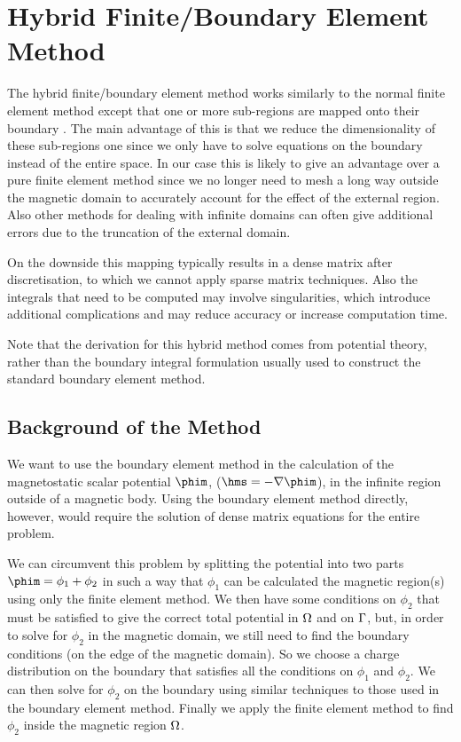 
\chapter{Hybrid Finite/Boundary Element Method}
\label{sec:hybr-finit-elem}
The hybrid finite/boundary element method works similarly to the normal finite element method except that one or more sub-regions are mapped onto their boundary \cite{Rammohan2002}.
The main advantage of this is that we reduce the dimensionality of these sub-regions one since we only have to solve equations on the boundary instead of the entire space.
In our case this is likely to give an advantage over a pure finite element method since we no longer need to mesh a long way outside the magnetic domain to accurately account for the effect of the external region. Also other methods for dealing with infinite domains can often give additional errors due to the truncation of the external domain.\cite{Bottauscio2008}

On the downside this mapping typically results in a dense matrix after discretisation, to which we cannot apply sparse matrix techniques.
Also the integrals that need to be computed may involve singularities, which introduce additional complications and may reduce accuracy or increase computation time.

Note that the derivation for this hybrid method comes from potential theory, rather than the boundary integral formulation usually used to construct the standard boundary element method.

\section{Background of the Method}
\label{sec:basic-method}
We want to use the boundary element method in the calculation of the magnetostatic scalar potential $\phim$, ($\hms = - \nabla \phim$), in the infinite region outside of a magnetic body.
Using the boundary element method directly, however, would require the solution of dense matrix equations for the entire problem.

We can circumvent this problem by splitting the potential into two parts $\phim = \phi_1 + \phi_2$ in such a way that $\phi_1$ can be calculated the magnetic region(s) using only the finite element method.
We then have some conditions on $\phi_2$ that must be satisfied to give the correct total potential in $\Omega$ and on ${\Gamma}$, but, in order to solve for $\phi_2$ in the magnetic domain, we still need to find the boundary conditions (on the edge of the magnetic domain).
So we choose a charge distribution on the boundary that satisfies all the conditions on $\phi_1$ and $\phi_2$.
We can then solve for $\phi_2$ on the boundary using similar techniques to those used in the boundary element method.
Finally we apply the finite element method to find $\phi_2$ inside the magnetic region $\Omega$.

